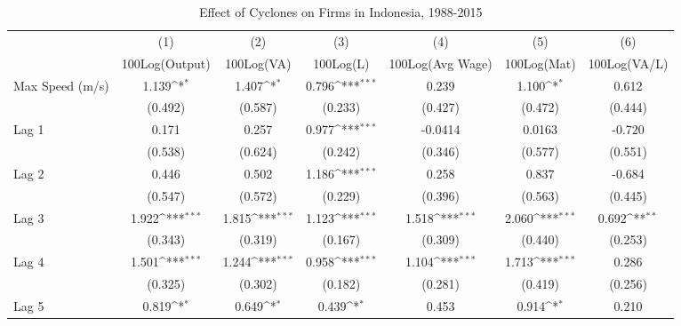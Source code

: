 \begin{table}[htbp]\centering
\def\sym#1{\ifmmode^{#1}\else\(^{#1}\)\fi}
\caption{Effect of Cyclones on Firms in Indonesia, 1988-2015}
\begin{tabular}{l*{6}{c}}
\toprule
                &\multicolumn{1}{c}{(1)}&\multicolumn{1}{c}{(2)}&\multicolumn{1}{c}{(3)}&\multicolumn{1}{c}{(4)}&\multicolumn{1}{c}{(5)}&\multicolumn{1}{c}{(6)}\\
                &\multicolumn{1}{c}{100Log(Output)}&\multicolumn{1}{c}{100Log(VA)}&\multicolumn{1}{c}{100Log(L)}&\multicolumn{1}{c}{100Log(Avg Wage)}&\multicolumn{1}{c}{100Log(Mat)}&\multicolumn{1}{c}{100Log(VA/L)}\\
\midrule
Max Speed (m/s) &    1.139\sym{*}  &    1.407\sym{*}  &    0.796\sym{***}&    0.239         &    1.100\sym{*}  &    0.612         \\
                &  (0.492)         &  (0.587)         &  (0.233)         &  (0.427)         &  (0.472)         &  (0.444)         \\
\addlinespace
Lag 1           &    0.171         &    0.257         &    0.977\sym{***}&  -0.0414         &   0.0163         &   -0.720         \\
                &  (0.538)         &  (0.624)         &  (0.242)         &  (0.346)         &  (0.577)         &  (0.551)         \\
\addlinespace
Lag 2           &    0.446         &    0.502         &    1.186\sym{***}&    0.258         &    0.837         &   -0.684         \\
                &  (0.547)         &  (0.572)         &  (0.229)         &  (0.396)         &  (0.563)         &  (0.445)         \\
\addlinespace
Lag 3           &    1.922\sym{***}&    1.815\sym{***}&    1.123\sym{***}&    1.518\sym{***}&    2.060\sym{***}&    0.692\sym{**} \\
                &  (0.343)         &  (0.319)         &  (0.167)         &  (0.309)         &  (0.440)         &  (0.253)         \\
\addlinespace
Lag 4           &    1.501\sym{***}&    1.244\sym{***}&    0.958\sym{***}&    1.104\sym{***}&    1.713\sym{***}&    0.286         \\
                &  (0.325)         &  (0.302)         &  (0.182)         &  (0.281)         &  (0.419)         &  (0.256)         \\
\addlinespace
Lag 5           &    0.819\sym{*}  &    0.649\sym{*}  &    0.439\sym{*}  &    0.453         &    0.914\sym{*}  &    0.210         \\

\end{tabular}
\end{table}
